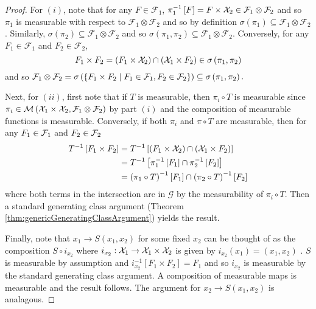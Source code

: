 \begin{proof}
For $\left(i\right)$, note that for any $F\in\mathcal{F}_{1}$, $\pi_{1}^{-1}\left[F\right]=F\times\mathcal{X}_{2}\in\mathcal{F}_{1}\otimes\mathcal{F}_{2}$
and so $\pi_{1}$ is measurable with respect to $\mathcal{F}_{1}\otimes\mathcal{F}_{2}$
and so by definition $\sigma\left(\pi_{1}\right)\subseteq\mathcal{F}_{1}\otimes\mathcal{F}_{2}$.
Similarly, $\sigma\left(\pi_{2}\right)\subseteq\mathcal{F}_{1}\otimes\mathcal{F}_{2}$
and so $\sigma\left(\pi_{1},\pi_{2}\right)\subseteq\mathcal{F}_{1}\otimes\mathcal{F}_{2}.$
Conversely, for any $F_{1}\in\mathcal{F}_{1}$ and $F_{2}\in\mathcal{F}_{2}$,
\[
F_{1}\times F_{2}=\left(F_{1}\times\mathcal{X}_{2}\right)\cap\left(\mathcal{X}_{1}\times F_{2}\right)\in\sigma\left(\pi_{1},\pi_{2}\right)
\]
 and so $\mathcal{F}_{1}\otimes\mathcal{F}_{2}=\sigma\left(\left\{ F_{1}\times F_{2}\mid F_{1}\in\mathcal{F}_{1},F_{2}\in\mathcal{F}_{2}\right\} \right)\subseteq\sigma\left(\pi_{1},\pi_{2}\right).$

Next, for $\left(ii\right)$, first note that if $T$ is measurable,
then $\pi_{i}\circ T$ is measurable since $\pi_{i}\in\mathcal{M}\left(\mathcal{X}_{1}\times\mathcal{X}_{2},\mathcal{F}_{1}\otimes\mathcal{F}_{2}\right)$
by part $\left(i\right)$ and the composition of measurable functions
is measurable. Conversely, if both $\pi_{i}$ and $\pi\circ T$ are
measurable, then for any $F_{1}\in\mathcal{F}_{1}$ and $F_{2}\in\mathcal{F}_{2}$
\begin{align*}
T^{-1}\left[F_{1}\times F_{2}\right] & =T^{-1}\left[\left(F_{1}\times\mathcal{X}_{2}\right)\cap\left(\mathcal{X}_{1}\times F_{2}\right)\right]\\
 & =T^{-1}\left[\pi_{1}^{-1}\left[F_{1}\right]\cap\pi_{2}^{-1}\left[F_{2}\right]\right]\\
 & =\left(\pi_{1}\circ T\right)^{-1}\left[F_{1}\right]\cap\left(\pi_{2}\circ T\right)^{-1}\left[F_{2}\right]
\end{align*}
where both terms in the intersection are in $\mathcal{G}$ by the
measurability of $\pi_{i}\circ T$. Then a standard generating class
argument (Theorem \ref{thm:genericGeneratingClassArgument}) yields
the result.

Finally, note that $x_{1}\to S\left(x_{1},x_{2}\right)$ for some
fixed $x_{2}$ can be thought of as the composition $S\circ i_{x_{2}}$
where $i_{x_{2}}:\mathcal{X}_{1}\to\mathcal{X}_{1}\times\mathcal{X}_{2}$ is given by $i_{x_{2}}\left(x_{1}\right)=\left(x_{1},x_{2}\right)$
. $S$ is measurable by assumption and $i_{x_{2}}^{-1}\left[F_{1}\times F_{2}\right]=F_{1}$
and so $i_{x_{2}}$ is measurable by the standard generating class
argument. A composition of measurable maps is measurable and the result
follows. The argument for $x_{2}\to S\left(x_{1},x_{2}\right)$ is
analagous.
\end{proof}

